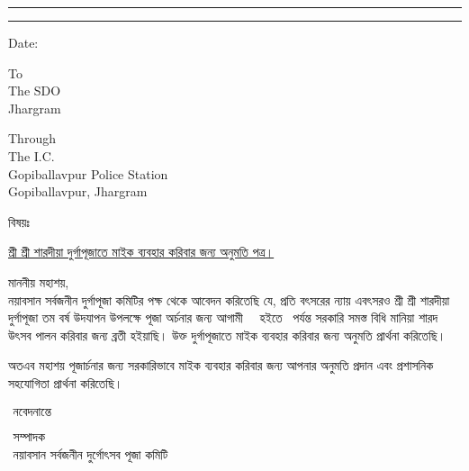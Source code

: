 
	\begin{center}
        \myheader
    \end{center}
    \hrule \vspace*{2pt} \hrule  \vspace*{20pt}
    \begin{adjustwidth}{15mm}{15mm}\large 
        \begin{flushright} 
            Date: \underline{\datecontainer}
        \end{flushright}\large\vspace{1cm}
        
        \noindent To\\
        The SDO\\
        Jhargram 
        
        \vspace{1cm}
        
        \noindent Through\\
        
        \vspace{.25cm}
        \noindent 
        The I.C.\\
        Gopiballavpur Police Station\\
        Gopiballavpur, Jhargram\\ 
        
        \noindent\begin{minipage}{.1\textwidth}বিষয়ঃ 
        \end{minipage}\begin{minipage}{.8\textwidth} 
            \underline{
                শ্রী শ্রী শারদীয়া দুর্গাপূজাতে মাইক ব্যবহার করিবার জন্য অনুমতি পত্র। 
            }
        \end{minipage}
        \vspace{.5cm}
        
        \noindent মাননীয় মহাশয়,\\
        \hspace*{1.5cm} নয়াবসান সর্বজনীন দুর্গাপূজা কমিটির পক্ষ থেকে আবেদন করিতেছি যে, প্রতি বৎসরের ন্যায় এবৎসরও  শ্রী শ্রী শারদীয়া দুর্গাপূজা \PujaYear তম বর্ষ উদযাপন উপলক্ষে পূজা অর্চনার জন্য আগামী  \PermissionFrom\ \FromDay\  হইতে  \PermissionTo\ \ToDay পর্যন্ত সরকারি সমস্ত বিধি মানিয়া শারদ উৎসব পালন করিবার জন্য ব্রতী হইয়াছি। উক্ত দুর্গাপূজাতে মাইক ব্যবহার করিবার জন্য অনুমতি প্রার্থনা করিতেছি। 
        
        \hspace{2cm}
        অতএব মহাশয় পূজার্চনার জন্য সরকারিভাবে মাইক ব্যবহার করিবার জন্য আপনার অনুমতি প্রদান এবং প্রশাসনিক সহযোগিতা প্রার্থনা করিতেছি। \\  
        
        
        \vspace{2ex}
        \begin{flushright}
            $\begin{array}{c}
                \mbox{নবেদনান্তে}
                \\ \\ \\
                \mbox{সম্পাদক}\\\mbox{নয়াবসান সর্বজনীন দুর্গোৎসব পূজা কমিটি}\end{array}$
        \end{flushright}
    \end{adjustwidth}
    